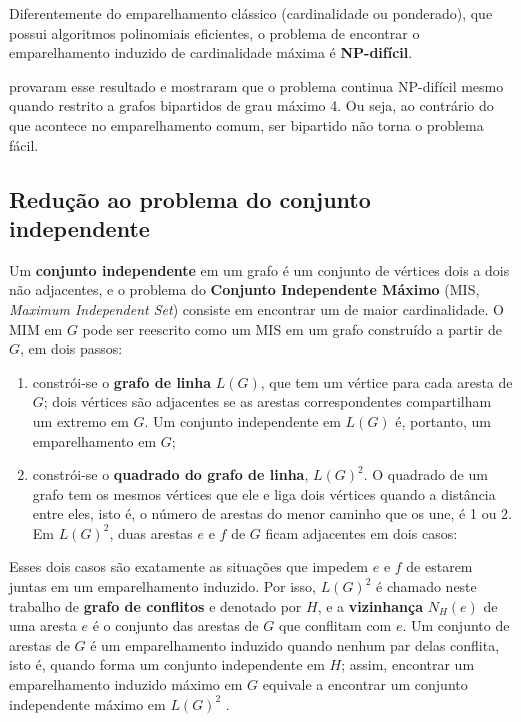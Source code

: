 Diferentemente do emparelhamento clássico (cardinalidade ou ponderado), que possui algoritmos polinomiais eficientes, o problema de encontrar o emparelhamento induzido de cardinalidade máxima é \textbf{NP-difícil}.

 provaram esse resultado e mostraram que o problema continua NP-difícil mesmo quando restrito a grafos bipartidos de grau máximo 4. Ou seja, ao contrário do que acontece no emparelhamento comum, ser bipartido não torna o problema fácil.

\subsection{Redução ao problema do conjunto independente}\label{sec:mim_reducao}

Um \textbf{conjunto independente} em um grafo é um conjunto de vértices dois a dois não adjacentes, e o problema do \textbf{Conjunto Independente Máximo} (MIS, \textit{Maximum Independent Set}) consiste em encontrar um de maior cardinalidade. O MIM em $G$ pode ser reescrito como um MIS em um grafo construído a partir de $G$, em dois passos:

\begin{enumerate}
    \item constrói-se o \textbf{grafo de linha} $L(G)$, que tem um vértice para cada aresta de $G$; dois vértices são adjacentes se as arestas correspondentes compartilham um extremo em $G$. Um conjunto independente em $L(G)$ é, portanto, um emparelhamento em $G$;
    \item constrói-se o \textbf{quadrado do grafo de linha}, $L(G)^2$. O quadrado de um grafo tem os mesmos vértices que ele e liga dois vértices quando a distância entre eles, isto é, o número de arestas do menor caminho que os une, é 1 ou 2. Em $L(G)^2$, duas arestas $e$ e $f$ de $G$ ficam adjacentes em dois casos:
\end{enumerate}

Esses dois casos são exatamente as situações que impedem $e$ e $f$ de estarem juntas em um emparelhamento induzido. Por isso, $L(G)^2$ é chamado neste trabalho de \textbf{grafo de conflitos} e denotado por $H$, e a \textbf{vizinhança} $N_H(e)$ de uma aresta $e$ é o conjunto das arestas de $G$ que conflitam com $e$. Um conjunto de arestas de $G$ é um emparelhamento induzido quando nenhum par delas conflita, isto é, quando forma um conjunto independente em $H$; assim, encontrar um emparelhamento induzido máximo em $G$ equivale a encontrar um conjunto independente máximo em $L(G)^2$ \cite{cameron}.

